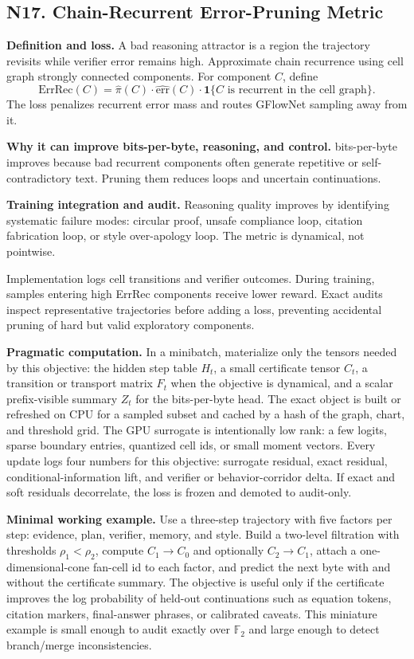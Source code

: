 \documentclass[10pt]{article}
\newcommand{\FF}{\mathbb{F}}
\numberwithin{equation}{section}
\begin{document}
\subsection{N17. Chain-Recurrent Error-Pruning Metric}
\noindent\textbf{Definition and loss.} A bad reasoning attractor is a region the trajectory revisits while verifier error remains high. Approximate chain recurrence using cell graph strongly connected components. For component $C$, define
\[
\mathrm{ErrRec}(C)=\widehat\pi(C)\cdot \widehat{\mathrm{err}}(C)\cdot \mathbf 1\{C\text{ is recurrent in the cell graph}\}.
\]
The loss penalizes recurrent error mass and routes GFlowNet sampling away from it.

\noindent\textbf{Why it can improve bits-per-byte, reasoning, and control.} bits-per-byte improves because bad recurrent components often generate repetitive or self-contradictory text. Pruning them reduces loops and uncertain continuations.

\noindent\textbf{Training integration and audit.} Reasoning quality improves by identifying systematic failure modes: circular proof, unsafe compliance loop, citation fabrication loop, or style over-apology loop. The metric is dynamical, not pointwise.

Implementation logs cell transitions and verifier outcomes. During training, samples entering high ErrRec components receive lower reward. Exact audits inspect representative trajectories before adding a loss, preventing accidental pruning of hard but valid exploratory components.

\noindent\textbf{Pragmatic computation.} In a minibatch, materialize only the tensors needed by this objective: the hidden step table $H_t$, a small certificate tensor $C_t$, a transition or transport matrix $F_t$ when the objective is dynamical, and a scalar prefix-visible summary $Z_t$ for the bits-per-byte head. The exact object is built or refreshed on CPU for a sampled subset and cached by a hash of the graph, chart, and threshold grid. The GPU surrogate is intentionally low rank: a few logits, sparse boundary entries, quantized cell ids, or small moment vectors. Every update logs four numbers for this objective: surrogate residual, exact residual, conditional-information lift, and verifier or behavior-corridor delta. If exact and soft residuals decorrelate, the loss is frozen and demoted to audit-only.

\noindent\textbf{Minimal working example.} Use a three-step trajectory with five factors per step: evidence, plan, verifier, memory, and style. Build a two-level filtration with thresholds $\rho_1<\rho_2$, compute $C_1\to C_0$ and optionally $C_2\to C_1$, attach a one-dimensional-cone fan-cell id to each factor, and predict the next byte with and without the certificate summary. The objective is useful only if the certificate improves the log probability of held-out continuations such as equation tokens, citation markers, final-answer phrases, or calibrated caveats. This miniature example is small enough to audit exactly over $\FF_2$ and large enough to detect branch/merge inconsistencies.
\end{document}
